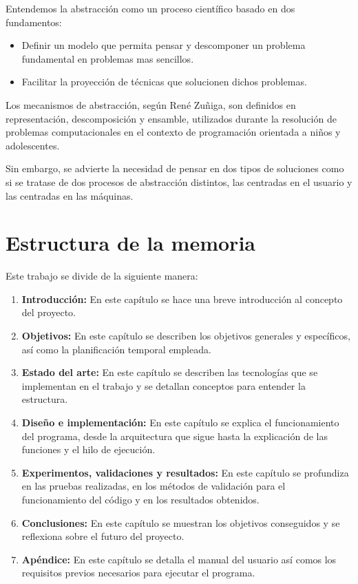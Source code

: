 \documentclass[a4paper, 12pt]{book}
\begin{document}
Entendemos la abstracción como un proceso científico basado en dos fundamentos:
\begin{itemize}
 \item Definir un modelo que permita pensar y descomponer un problema fundamental en problemas mas sencillos.
 \item Facilitar la proyección de técnicas que solucionen dichos problemas.
\end{itemize}

Los mecanismos de abstracción, según René Zuñiga, \cite{munoz2014abstraccion} son definidos en representación, descomposición y ensamble, utilizados durante la resolución de problemas computacionales en el contexto de programación orientada a niños y adolescentes. 

Sin embargo, se advierte la necesidad de pensar en dos tipos de soluciones como si se tratase de dos procesos de abstracción distintos, las centradas en el usuario y las centradas en las máquinas. \cite{wing_socialissues}

\section{Estructura de la memoria}
\label{sec:estructura}

Este trabajo se divide de la siguiente manera:

\begin{enumerate}
  	\item \textbf{Introducción:} En este capítulo se hace una breve introducción al concepto del proyecto. 
  	\item \textbf{Objetivos:} En este capítulo se describen los objetivos generales y específicos, así como la planificación temporal empleada.
  	\item \textbf{Estado del arte:} En este capítulo se describen las tecnologías que se implementan en el trabajo y se detallan conceptos para entender la estructura.
  	\item \textbf{Diseño e implementación:} En este capítulo se explica el funcionamiento del programa, desde la arquitectura que sigue hasta la explicación de las funciones y el hilo de ejecución.
  	\item \textbf{Experimentos, validaciones y resultados:} En este capítulo se profundiza en las pruebas realizadas, en los métodos de validación para el funcionamiento del código y en los resultados obtenidos.
  	\item \textbf{Conclusiones:} En este capítulo se muestran los objetivos conseguidos y se reflexiona sobre el futuro del proyecto.
  	\item \textbf{Apéndice:} En este capítulo se detalla el manual del usuario así comos los requisitos previos necesarios para ejecutar el programa.  
\end{enumerate}
\end{document}
